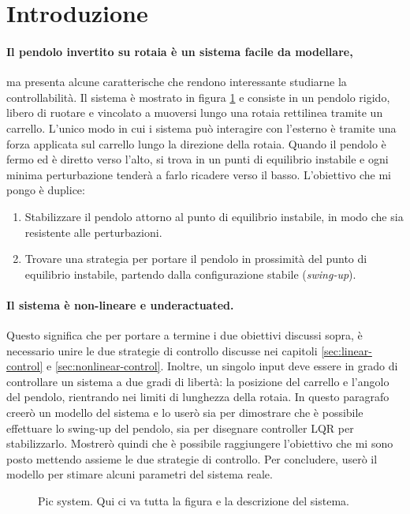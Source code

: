\section{Introduzione}
\paragraph{Il pendolo invertito su rotaia è un sistema facile da modellare,}
ma presenta alcune caratterische che rendono interessante studiarne la controllabilità.
Il sistema è mostrato in figura \ref{fig:pic} e consiste in un pendolo rigido, libero di ruotare e vincolato a muoversi lungo una rotaia rettilinea tramite un carrello. L'unico modo in cui i sistema può interagire con l'esterno è tramite una forza applicata sul carrello lungo la direzione della rotaia. Quando il pendolo è fermo ed è diretto verso l'alto, si trova in un punti di equilibrio instabile e ogni minima perturbazione tenderà a farlo ricadere verso il basso. L'obiettivo che mi pongo è duplice:

\begin{enumerate}
    \item Stabilizzare il pendolo attorno al punto di equilibrio instabile, in modo che sia resistente alle perturbazioni.
    \item Trovare una strategia per portare il pendolo in prossimità del punto di equilibrio instabile, partendo dalla configurazione stabile (\emph{swing-up}).
\end{enumerate}

\paragraph{Il sistema è non-lineare e underactuated.} Questo significa che per portare a termine i due obiettivi discussi sopra, è necessario unire le due strategie di controllo discusse nei capitoli \ref{sec:linear-control}  e \ref{sec:nonlinear-control}. Inoltre, un singolo input deve essere in grado di controllare un sistema a due gradi di libertà: la posizione del carrello e l'angolo del pendolo, rientrando nei limiti di lunghezza della rotaia. In questo paragrafo creerò un modello del sistema e lo userò sia per dimostrare che è possibile effettuare lo swing-up del pendolo, sia per disegnare controller LQR per stabilizzarlo. Mostrerò quindi che è possibile raggiungere l'obiettivo che mi sono posto mettendo assieme le due strategie di controllo. Per concludere, userò il modello per stimare alcuni parametri del sistema reale.

\begin{figure}[thb]
    \centering
    \caption{Pic system. Qui ci va tutta la figura e la descrizione del sistema. }%
    \label{fig:pic}
\end{figure}